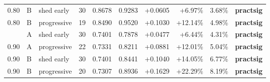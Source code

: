 \documentclass{article}
\begin{document}
\begin{table}[h]
{\begin{tabular}{lllrrrrrrl}
0.80 & B & shed early & 30 & 0.8678 & 0.9283 & +0.0605 & +6.97\% & 3.68\% & \textbf{practsig} \\
0.80 & B & progressive & 19 & 0.8490 & 0.9520 & +0.1030 & +12.14\% & 4.98\% & \textbf{practsig} \\
\addlinespace
0.90 & A & shed early & 30 & 0.7401 & 0.7878 & +0.0477 & +6.44\% & 4.31\% & \textbf{practsig} \\
0.90 & A & progressive & 22 & 0.7331 & 0.8211 & +0.0881 & +12.01\% & 5.04\% & \textbf{practsig} \\
0.90 & B & shed early & 30 & 0.7401 & 0.8441 & +0.1040 & +14.05\% & 6.77\% & \textbf{practsig} \\
0.90 & B & progressive & 20 & 0.7307 & 0.8936 & +0.1629 & +22.29\% & 8.19\% & \textbf{practsig} \\
\bottomrule
\end{tabular}%
}
\end{table}
\end{document}
